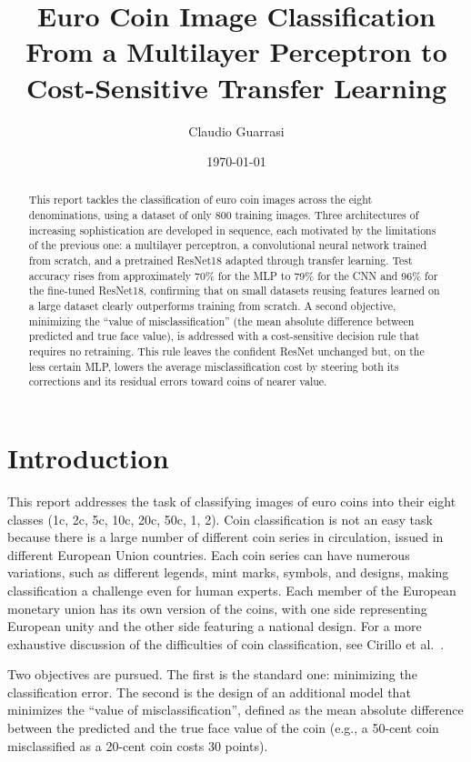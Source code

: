 \documentclass[11pt,a4paper]{article}
\title{\textbf{Euro Coin Image Classification}\\
\large From a Multilayer Perceptron to Cost-Sensitive Transfer Learning}
\author{Claudio Guarrasi\\[1ex]}
\date{\today}
\begin{document}
\maketitle

\begin{abstract}
This report tackles the classification of euro coin images across the eight
denominations, using a dataset of only 800 training images. Three architectures of
increasing sophistication are developed in sequence, each motivated by the limitations
of the previous one: a multilayer perceptron, a convolutional neural network trained
from scratch, and a pretrained ResNet18 adapted through transfer learning. Test accuracy
rises from approximately 70\% for the MLP to 79\% for the CNN and 96\% for the
fine-tuned ResNet18, confirming that on small datasets reusing features learned on a
large dataset clearly outperforms training from scratch. A second objective, minimizing
the ``value of misclassification'' (the mean absolute difference between predicted and
true face value), is addressed with a cost-sensitive decision rule that requires no
retraining. This rule leaves the confident ResNet unchanged but, on the less certain
MLP, lowers the average misclassification cost by steering both its corrections and its
residual errors toward coins of nearer value.
\end{abstract}

\tableofcontents

\section{Introduction}
\label{sec:intro}

This report addresses the task of classifying images of euro coins into their eight
classes (1c, 2c, 5c, 10c, 20c, 50c, 1\officialeuro{}, 2\officialeuro{}).
Coin classification is not an easy task because there is a large number of different
coin series in circulation, issued in different European Union countries. Each coin
series can have numerous variations, such as different legends, mint marks, symbols, and
designs, making classification a challenge even for human experts. Each member of the
European monetary union has its own version of the coins, with one side representing
European unity and the other side featuring a national design. For a more exhaustive
discussion of the difficulties of coin classification, see Cirillo et al.~\cite{cirillo2024}.
 
Two objectives are pursued. The first is the standard one: minimizing the classification
error. The second is the design of an additional model that minimizes the
``value of misclassification'', defined as the mean absolute difference between the
predicted and the true face value of the coin (e.g., a 50-cent coin misclassified as a
20-cent coin costs 30 points).
 
\end{document}
